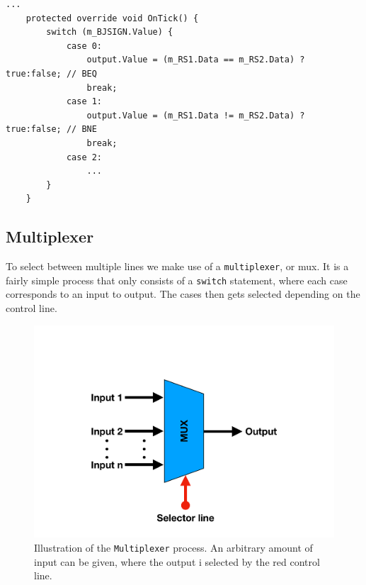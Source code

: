         \begin{minipage}{\linewidth}
            \begin{lstlisting}[language={[Sharp]C}, caption={A slice of the \texttt{Go To} process SME code. The unit consists of a \texttt{switch} statement, where each case does the comparison relevandt to the branching instruction. The conditional operator \texttt{?} is used for the comparison (the syntax goes as follows \texttt{condition ? If true return this : If false return this}).},captionpos=b, label = GOTO]
...
    protected override void OnTick() {
        switch (m_BJSIGN.Value) {
            case 0:
                output.Value = (m_RS1.Data == m_RS2.Data) ? true:false; // BEQ
                break;
            case 1:
                output.Value = (m_RS1.Data != m_RS2.Data) ? true:false; // BNE
                break;
            case 2:
                ...
        }
    }
            \end{lstlisting}
        \end{minipage}
    
    \subsection{Multiplexer}
        To select between multiple lines we make use of a \texttt{multiplexer}, or mux. It is a fairly simple process that only consists of a \texttt{switch} statement, where each case corresponds to an input to output. The cases then gets selected depending on the control line. 
        
        \begin{figure}[h!]
            \centering
            \includegraphics[scale=0.35]{pictures/MUX.pdf}
            \caption{Illustration of the \texttt{Multiplexer} process. An arbitrary amount of input can be given, where the output i selected by the red control line. }
            \label{fig:MUX}
        \end{figure}
    
